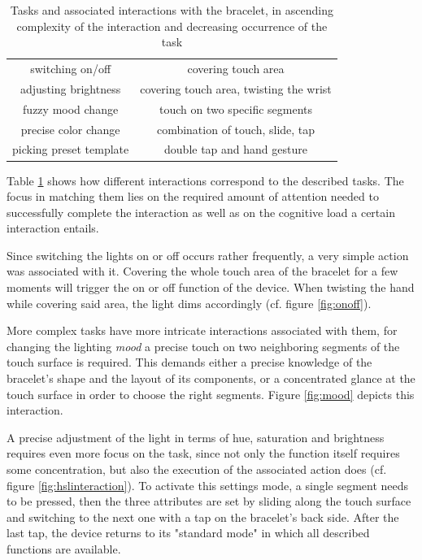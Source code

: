 \begin{table}
	\myfloatalign
	\begin{tabularx}{.95\textwidth}{cc}
		\toprule
		\tableheadline{Task} & \tableheadline{Associated Interaction}\\ 
		\midrule
		switching on/off & covering touch area\\
		adjusting brightness & covering touch area, twisting the wrist\\
		fuzzy mood change & touch on two specific segments\\
		precise color change & combination of touch, slide, tap\\
		picking preset template & double tap and hand gesture\\
		\bottomrule
	\end{tabularx}
	\caption[Tasks and associated interactions with the bracelet]{Tasks and associated interactions with the bracelet, in ascending complexity of the interaction and decreasing occurrence of the task}  \label{tab:interaction}
\end{table}

Table \ref{tab:interaction} shows how different interactions correspond to the described tasks. The focus in matching them lies on the required amount of attention needed to successfully complete the interaction as well as on the cognitive load a certain interaction entails. 

Since switching the lights on or off occurs rather frequently, a very simple action was associated with it. Covering the whole touch area of the bracelet for a few moments will trigger the on or off function of the device. When twisting the hand while covering said area, the light dims accordingly (cf. figure \ref{fig:onoff}). 

More complex tasks have more intricate interactions associated with them, for changing the lighting \textit{mood} a precise touch on two neighboring segments of the touch surface is required. This demands either a precise knowledge of the bracelet's shape and the layout of its components, or a concentrated glance at the touch surface in order to choose the right segments. Figure \ref{fig:mood} depicts this interaction.

A precise adjustment of the light in terms of hue, saturation and brightness requires even more focus on the task, since not only the function itself requires some concentration, but also the execution of the associated action does (cf. figure \ref{fig:hslinteraction}). To activate this settings mode, a single segment needs to be pressed, then the three attributes are set by sliding along the touch surface and switching to the next one with a tap on the bracelet's back side. After the last tap, the device returns to its "standard mode" in which all described functions are available.

